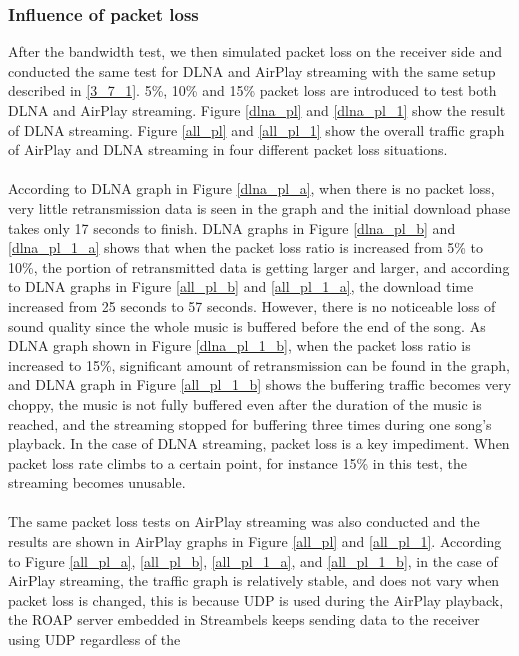 \subsubsection{Influence of packet loss\label{4_1_3}}
After the bandwidth test, we then simulated packet loss on the receiver side and
conducted the same test for DLNA and AirPlay streaming with the same setup
described in \ref{3_7_1}. 5\%, 10\% and 15\% packet loss are introduced to test
both DLNA and AirPlay streaming. Figure \ref{dlna_pl} and \ref{dlna_pl_1} show
the result of DLNA streaming. Figure \ref{all_pl} and \ref{all_pl_1} show the
overall traffic graph of AirPlay and DLNA streaming in four different packet
loss situations.\\
\\
According to DLNA graph in Figure \ref{dlna_pl_a}, when there is no packet
loss, very little retransmission data is seen in the graph and the initial
download phase takes only 17 seconds to finish. DLNA graphs in Figure
\ref{dlna_pl_b} and \ref{dlna_pl_1_a} shows that when the packet loss ratio is
increased from 5\% to 10\%, the portion of retransmitted data is getting larger
and larger, and according to DLNA graphs in Figure \ref{all_pl_b} and
\ref{all_pl_1_a}, the download time increased from 25 seconds to 57 seconds.
However, there is no noticeable loss of sound quality since the whole music is
buffered before the end of the song. As DLNA graph shown in Figure
\ref{dlna_pl_1_b}, when the packet loss ratio is increased to 15\%, significant
amount of retransmission can be found in the graph, and DLNA graph in Figure
\ref{all_pl_1_b} shows the buffering traffic becomes very choppy, the music
is not fully buffered even after the duration of the music is reached, and the
streaming stopped for buffering three times during one song's playback. In the
case of DLNA streaming, packet loss is a key impediment. When packet loss rate
climbs to a certain point, for instance 15\% in this test, the streaming
becomes unusable.\\
\\
The same packet loss tests on AirPlay streaming was also conducted and the
results are shown in AirPlay graphs in Figure \ref{all_pl} and \ref{all_pl_1}.
According to Figure \ref{all_pl_a}, \ref{all_pl_b}, \ref{all_pl_1_a}, and
\ref{all_pl_1_b}, in the case of AirPlay streaming, the traffic graph is
relatively stable, and does not vary when packet loss is changed, this is
because UDP is used during the AirPlay playback, the ROAP server embedded in
Streambels keeps sending data to the receiver using UDP regardless of the
